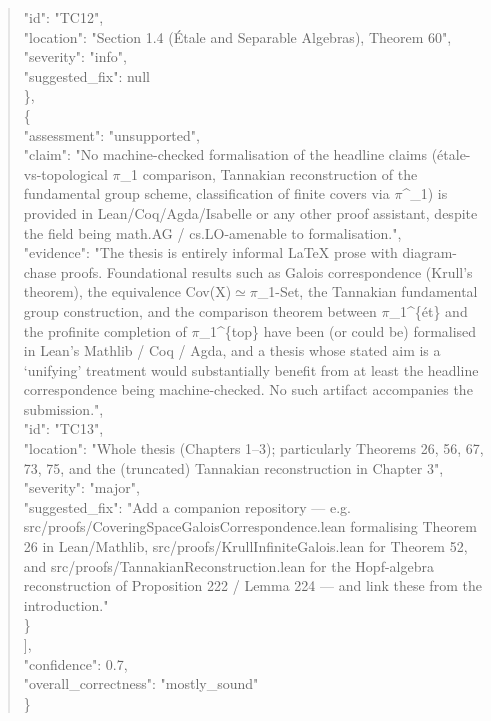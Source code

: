 \documentclass[11pt]{article}
\begin{document}
\begin{quote}
      "id": "TC12",\\
      "location": "Section 1.4 (Étale and Separable Algebras), Theorem 60",\\
      "severity": "info",\\
      "suggested\_fix": null\\
    \},\\
    \{\\
      "assessment": "unsupported",\\
      "claim": "No machine-checked formalisation of the headline claims (étale-vs-topological \ensuremath{\pi}\_1 comparison, Tannakian reconstruction of the fundamental group scheme, classification of finite covers via \ensuremath{\pi}\^{}\_1) is provided in Lean/Coq/Agda/Isabelle or any other proof assistant, despite the field being math.AG / cs.LO-amenable to formalisation.",\\
      "evidence": "The thesis is entirely informal LaTeX prose with diagram-chase proofs. Foundational results such as Galois correspondence (Krull’s theorem), the equivalence Cov(X)\ensuremath{\simeq}\ensuremath{\pi}\_1-Set, the Tannakian fundamental group construction, and the comparison theorem between \ensuremath{\pi}\_1\^{}\{ét\} and the profinite completion of \ensuremath{\pi}\_1\^{}\{top\} have been (or could be) formalised in Lean’s Mathlib / Coq / Agda, and a thesis whose stated aim is a ‘unifying’ treatment would substantially benefit from at least the headline correspondence being machine-checked. No such artifact accompanies the submission.",\\
      "id": "TC13",\\
      "location": "Whole thesis (Chapters 1--3); particularly Theorems 26, 56, 67, 73, 75, and the (truncated) Tannakian reconstruction in Chapter 3",\\
      "severity": "major",\\
      "suggested\_fix": "Add a companion repository --- e.g. src/proofs/CoveringSpaceGaloisCorrespondence.lean formalising Theorem 26 in Lean/Mathlib, src/proofs/KrullInfiniteGalois.lean for Theorem 52, and src/proofs/TannakianReconstruction.lean for the Hopf-algebra reconstruction of Proposition 222 / Lemma 224 --- and link these from the introduction."\\
    \}\\
  ],\\
  "confidence": 0.7,\\
  "overall\_correctness": "mostly\_sound"\\
\}\\
\end{quote}
\end{document}

